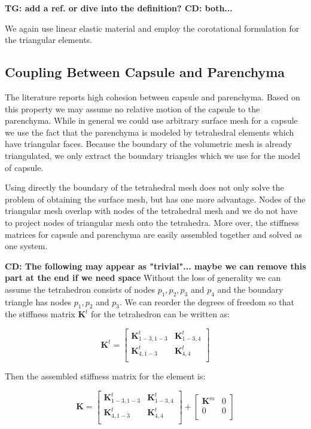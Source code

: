 \documentclass{llncs}
\newcommand{\TG}[1]{{\color{blue}\textbf{TG: #1}}}
\newcommand{\CD}[1]{{\color{green}\textbf{CD: #1}}}
\newcommand{\Mat}[1]{\mathbf{#1}}
\begin{document}
\TG{add a ref. or dive into the definition? \cite{Felippa2003}} \CD{both...}

We again use linear elastic material and employ the corotational formulation
for the triangular elements.


\subsection{Coupling Between Capsule and Parenchyma} %

The literature reports high cohesion between capsule and parenchyma.
Based on this
property we may assume no relative motion of the capsule to the parenchyma.
While in general we could use arbitrary surface mesh for a capsule we use
the fact that the parenchyma is modeled by tetrahedral elements which have
triangular faces. Because the boundary of the volumetric mesh is already
triangulated, we only extract the boundary triangles which we use for the
model of capsule.

Using directly the boundary of the tetrahedral mesh does not only solve the
problem of obtaining the surface mesh, but has one more advantage. Nodes
of the triangular mesh overlap with nodes of the tetrahedral mesh and we do
not have to project nodes of triangular mesh onto the tetrahedra. More over,
the stiffness matrices for capsule and parenchyma are easily assembled
together and solved as one system.

\CD{The following may appear as "trivial"... maybe we can remove this part at the end if we need space} 
Without the loss of generality we can assume the tetrahedron consists of
nodes $p_1, p_2, p_3$ and $p_4$ and the boundary triangle has nodes $p_1, p_2$
and $p_3$. We can reorder the degrees of freedom so that the stiffness
matrix $\Mat{K}^t$ for the tetrahedron can be written as:

\begin{equation}
  \Mat{K}^t = \left[\begin{array}{c|c}
      \Mat{K}^t_{1-3,1-3} & \Mat{K}^t_{1-3,4} \\
      \hline
      \Mat{K}^t_{4,1-3} & \Mat{K}^t_{4,4} \\
  \end{array}\right]
\end{equation}

Then the assembled stiffness matrix for the element is:

\begin{equation}
  \Mat{K} = \left[\begin{array}{c|c}
      \Mat{K}^t_{1-3,1-3} & \Mat{K}^t_{1-3,4} \\
      \hline
      \Mat{K}^t_{4,1-3} & \Mat{K}^t_{4,4} \\
  \end{array}\right]
  +
  \left[\begin{array}{c|c}
      \Mat{K}^m & 0 \\
      \hline
      0 & 0 \\
  \end{array}\right]
\end{equation}
\end{document}
